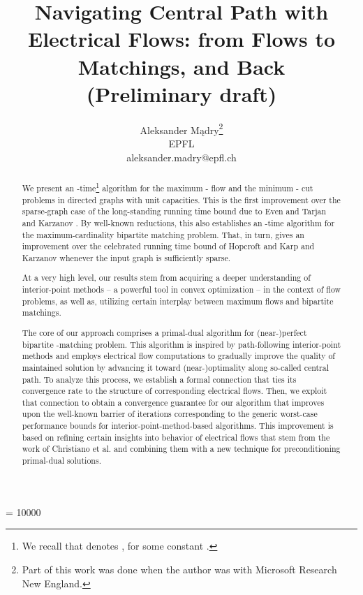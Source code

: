 \documentclass[11pt, letterpaper]{article}
\begin{document}
\widowpenalty = 10000



\title{Navigating Central Path with Electrical Flows: from Flows to Matchings, and Back \\{\bf (Preliminary draft)}}

\author{Aleksander M\k{a}dry\thanks{Part of this work was done when the author was with Microsoft Research New England.}\\
       {EPFL}\\
       { aleksander.madry@epfl.ch}}
\date{}

\maketitle
\begin{abstract}

We present an -time\footnote{We recall that  denotes , for some constant .} algorithm for the maximum - flow and the minimum - cut problems in directed graphs with unit capacities. This is the first improvement over the sparse-graph case of the long-standing  running time bound due to Even and Tarjan \cite{EvenT75} and Karzanov \cite{Karzanov73}. By well-known reductions, this also establishes an -time algorithm for the maximum-cardinality bipartite matching problem. That, in turn, gives an improvement over the celebrated  running time bound of Hopcroft and Karp \cite{HopcroftK73} and Karzanov \cite{Karzanov73} whenever the input graph is sufficiently sparse. 

At a very high level, our results stem from acquiring a deeper understanding of interior-point methods -- a powerful tool in convex optimization -- in the context of flow problems, as well as, utilizing certain interplay between maximum flows and bipartite matchings.

The core of our approach comprises a primal-dual algorithm for {(near-)}perfect bipartite -matching problem. This algorithm is inspired by path-following interior-point methods and employs electrical flow computations to gradually improve the quality of maintained solution by advancing it toward (near-)optimality along so-called central path. To analyze this process, we establish a formal connection that ties its convergence rate to the structure of corresponding electrical flows. Then, we exploit that connection to obtain a convergence guarantee for our algorithm that improves upon the well-known barrier of  iterations corresponding to the generic worst-case performance bounds for interior-point-method-based algorithms. This improvement is based on refining certain insights into behavior of electrical flows that stem from the work of Christiano et al. \cite{ChristianoKMST11} and combining them with a new technique for preconditioning primal-dual solutions.


\end{abstract}
\end{document}
